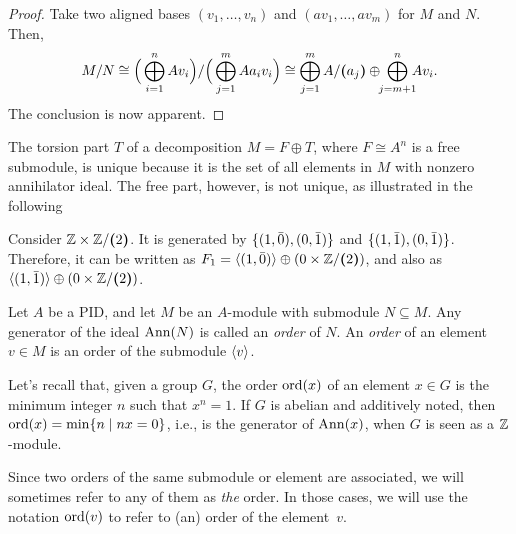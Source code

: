 \begin{proof}
    Take two aligned bases $(v_1,\dots,v_n)$ and $(av_1,\dots,av_m)$ for $M$ and $N$. Then,
    $$
        M/N\cong\Big(\bigoplus_{i=1}^nAv_i\Big)
            /\Big(\bigoplus_{j=1}^mAa_iv_i\Big)
            \cong\bigoplus_{j=1}^mA/\textrm{\boldmath$($}a_j\textrm{\boldmath$)$}\oplus
                \!\!\bigoplus_{j=m+1}^n
                    \!\!\!Av_i.
    $$
    The conclusion is now apparent.
\end{proof}

\begin{rem}\label{rem:Mtor-characterization}
    The torsion part\/ $T$ of a decomposition $M = F\oplus T$, where\/ $F\cong A^n$ is a free submodule, is unique because it is the set of all elements in\/ $M$ with nonzero annihilator ideal. The free part, however, is not unique, as illustrated in the following
\end{rem}

\begin{xmpl}
    Consider\/ $\mathbb{Z} \times \mathbb{Z}/\textrm{\boldmath$($}2\textrm{\boldmath$)$}$. It is generated by\/ $\{(1, \bar0), (0, \bar1)\}$ and\/ $\{(1, \bar1), (0, \bar1)\}$. Therefore, it can be written as\/ $F_1 = \langle(1,\bar0)\rangle\oplus(0\times\mathbb{Z}/\textrm{\boldmath$($}2\textrm{\boldmath$)$})$, and also as\/ $\langle(1,\bar1)\rangle\oplus(0\times\mathbb{Z}/\textrm{\boldmath$($}2\textrm{\boldmath$)$})$.
\end{xmpl}

\begin{defn}
    Let\/ $A$ be a PID, and let\/ $M$ be an\/ $A$-module with submodule\/ $N \subseteq M$. Any generator of the ideal\/ $\operatorname{\operatorname{Ann}}(N)$ is called an \textsl{order} of\/ $N$. An \textsl{order} of an element\/ $v\in M$ is an order of the submodule\/ $\langle v\rangle$.
\end{defn}

\begin{rem}
    Let's recall that, given a group $G$, the order $\operatorname{ord}(x)$ of an element $x\in G$ is the minimum integer $n$ such that $x^n=1$. If $G$ is abelian and additively noted, then $\operatorname{ord}(x)=\min\{n\mid nx=0\}$, i.e., is the generator of $\operatorname{\operatorname{Ann}}(x)$, when $G$ is seen as a $\mathbb{Z}$-module.
\end{rem}

\begin{rem}
    Since two orders of the same submodule or element are associated, we will sometimes refer to any of them as \textsl{the} order. In those cases, we will use the notation $\operatorname{ord}(v)$ to refer to (an) order of the element~$v$.
\end{rem}

